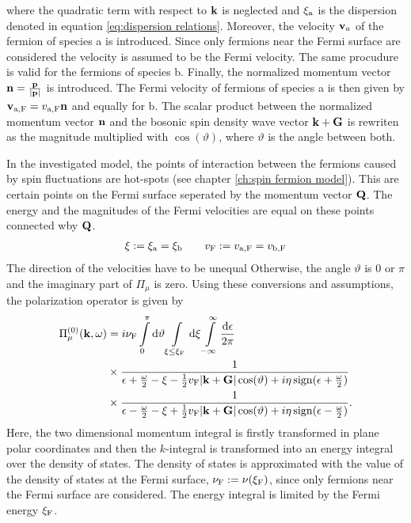 %
where the quadratic term with respect to $\vb{k}$ is neglected and $\xi_{\mathrm{a}}$ is the dispersion denoted in equation \eqref{eq:dispersion relations}.
Moreover, the velocity $\vb{v}_{a}$ of the fermion of species a is introduced.
Since only fermions near the Fermi surface are considered the velocity is assumed to be the Fermi velocity.
The same procudure is valid for the fermions of species b.
Finally, the normalized momentum vector $\vb{n} = \frac{\vb{p}}{|\vb{p}|}$ is introduced.
The Fermi velocity of fermions of species a is then given by $\vb{v}_{\mathrm{a,F}} = v_{\mathrm{a,F}} \vb{n}$ and equally for b.
The scalar product between the normalized momentum vector $\vb{n}$ and the bosonic spin density wave vector $\vb{k} + \vb{G}$ is rewriten as the magnitude multiplied with $\cos(\vartheta)$, where $\vartheta$ is the angle between both.

In the investigated model, the points of interaction between the fermions caused by spin fluctuations are hot-spots (see chapter \ref{ch:spin fermion model}).
This are certain points on the Fermi surface seperated by the momentum vector $\vb{Q}$.
The energy and the magnitudes of the Fermi velocities are equal on these points connected wby $\vb{Q}$.
%
\begin{align}
	\xi := \xi_{\mathrm{a}} = \xi_{\mathrm{b}} \qquad v_{\mathrm{F}} := v_{\mathrm{a,F}} = v_{\mathrm{b,F}}
\end{align}
%
The direction of the velocities have to be unequal
Otherwise, the angle $\vartheta$ is $0$ or $\pi$ and the imaginary part of $\Pi_{\mu}$ is zero.
Using these conversions and assumptions, the polarization operator is given by
%
\begin{align}
	\Pi_{\mu}^{(0)}(\vb{k}, \omega) &= 
		i \nu_{\mathrm{F}}
		\int\limits_{0}^{\pi} \dd{\vartheta}
		\int\limits_{\xi \leq \xi_{\mathrm{F}}} \dd{\xi}
		\int\limits_{-\infty}^{\infty} \frac{\dd{\epsilon}}{2\pi}
		\notag \\ &\times
		\frac{1}{\epsilon + \frac{\omega}{2} - \xi - \frac{1}{2} v_{\mathrm{F}} |\vb{k} + \vb{G}| \cos(\vartheta) + i \eta \operatorname{sign}(\epsilon + \frac{\omega}{2})}
		\notag \\ &\times
		\frac{1}{\epsilon - \frac{\omega}{2} - \xi + \frac{1}{2} v_{\mathrm{F}} |\vb{k} + \vb{G}| \cos(\vartheta) + i \eta \operatorname{sign}(\epsilon - \frac{\omega}{2})}.
	\label{appeq:pol operator before epsilon integration}
\end{align}
%
Here, the two dimensional momentum integral is firstly transformed in plane polar coordinates and then the $k$-integral is transformed into an energy integral over the density of states.
The density of states is approximated with the value of the density of states at the Fermi surface, $\nu_{\mathrm{F}} := \nu(\xi_{\mathrm{F}})$, since only fermions near the Fermi surface are considered.
The energy integral is limited by the Fermi energy $\xi_{\mathrm{F}}$.

